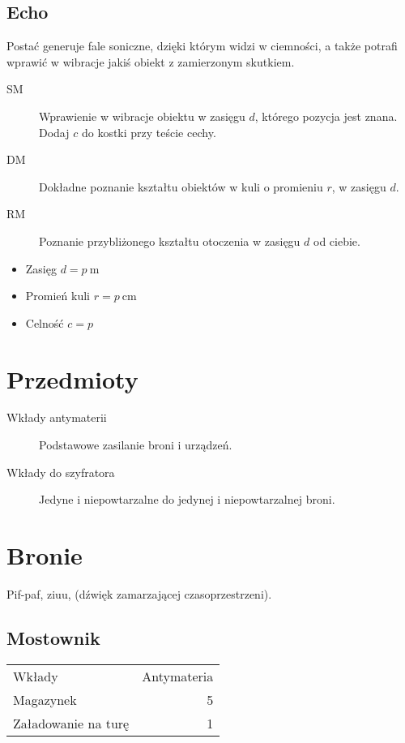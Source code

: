 \subsection{Echo}
Postać generuje fale soniczne, dzięki którym widzi w ciemności, a także potrafi wprawić w wibracje jakiś obiekt z zamierzonym skutkiem.
\begin{description}
	\item[SM] Wprawienie w wibracje obiektu w zasięgu $d$, którego pozycja jest znana. Dodaj $c$ do kostki przy teście cechy.
	\item[DM] Dokładne poznanie kształtu obiektów w kuli o promieniu $r$, w zasięgu $d$.
	\item[RM] Poznanie przybliżonego kształtu otoczenia w zasięgu $d$ od ciebie.
\end{description}
\begin{itemize}
	\item Zasięg $d = p \ \si{\meter}$
	\item Promień kuli $r = p \ \si{\centi\meter}$
	\item Celność $c = p$
\end{itemize}



\section{Przedmioty}
\begin{description}
	\item[Wkłady antymaterii] Podstawowe zasilanie broni i urządzeń.
	\item[Wkłady do szyfratora] Jedyne i niepowtarzalne do jedynej i niepowtarzalnej broni.
\end{description}

\section{Bronie}
Pif-paf, ziuu, (dźwięk zamarzającej czasoprzestrzeni).
\subsection{Mostownik \abs{}}

\begin{tabular}{lr}
Wkłady & Antymateria \\
Magazynek & 5 \\
Załadowanie na turę & 1 \\
\end{tabular}

